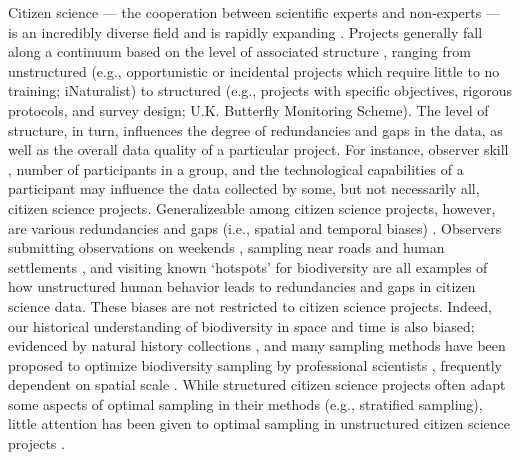 \documentclass[9pt,twocolumn,twoside,lineno]{pnas-new}
\begin{document}
Citizen science --- the cooperation between scientific experts and non-experts  --- is an incredibly diverse field \cite{jordan2015citizen} and is rapidly expanding \cite{newman2012future, pocock2017diversity}. Projects generally fall along a continuum based on the level of associated structure \cite{kelling2019using, welvaert2016citizen}, ranging from unstructured (e.g., opportunistic or incidental projects which require little to no training; iNaturalist) to structured (e.g., projects with specific objectives, rigorous protocols, and survey design; U.K. Butterfly Monitoring Scheme). The level of structure, in turn, influences the degree of redundancies and gaps in the data, as well as the overall data quality of a particular project. For instance, observer skill \cite{kelling2015can}, number of participants in a group, and the technological capabilities of a participant may influence the data collected by some, but not necessarily all, citizen science projects. Generalizeable among citizen science projects, however, are various redundancies and gaps (i.e., spatial and temporal biases) \cite{boakes2010distorted, bird2014statistical}. Observers submitting observations on weekends \cite{courter2013weekend}, sampling near roads and human settlements \cite{kelling2015taking}, and visiting known `hotspots' for biodiversity \cite{geldmann2016determines} are all examples of how unstructured human behavior leads to redundancies and gaps in citizen science data. These biases are not restricted to citizen science projects. Indeed, our historical understanding of biodiversity in space and time is also biased; evidenced by natural history collections \cite{pyke2010biological, boakes2010distorted}, and many sampling methods have been proposed to optimize biodiversity sampling by professional scientists \cite{etienne2005new, moreno2000assessing, colwell1994estimating, longino1997biodiversity, ferrarini2012biodiversity}, frequently dependent on spatial scale \cite{chase2013scale}. While structured citizen science projects often adapt some aspects of optimal sampling in their methods (e.g., stratified sampling), little attention has been given to optimal sampling in unstructured citizen science projects \cite{harrison2014assessing}.
\end{document}
